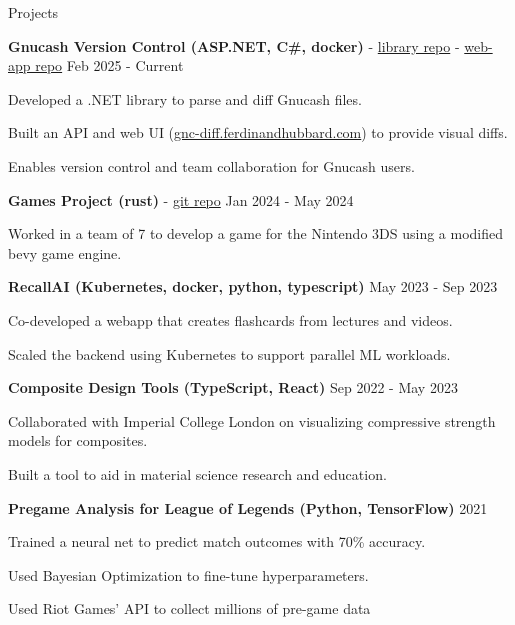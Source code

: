 \documentclass{resume} %
\let\olditemize\itemize
\let\endolditemize\enditemize
\renewenvironment{itemize}{
  \vspace*{-6pt}
  \olditemize
  \setlength{\itemsep}{0pt}    %
  \setlength{\topsep}{0pt}         %
  \setlength{\partopsep}{0pt}      %
  \setlength{\parsep}{0pt}         %
  \setlength{\parskip}{0pt}        %
  \setlength{\leftmargin}{1em}     %
}{\endolditemize}
\begin{document}
\begin{rSection}{Projects}

\textbf{Gnucash Version Control (ASP.NET, C\#, docker)} - \href{https://github.com/ferdinandhubbard981/gnucash-diff}{library repo} - \href{https://github.com/ferdinandhubbard981/gnucash-version-control-web}{web-app repo} \hfill Feb 2025 - Current
\begin{itemize}
    \item Developed a .NET library to parse and diff Gnucash files.
    \item Built an API and web UI (\href{https://gnc-diff.ferdinandhubbard.com}{gnc-diff.ferdinandhubbard.com}) to provide visual diffs.
    \item Enables version control and team collaboration for Gnucash users.
\end{itemize}

\textbf{Games Project (rust)} - \href{https://github.com/Team-Yarg/these\_times\_of\_mine}{git repo} \hfill Jan 2024 - May 2024
\begin{itemize}
    \item Worked in a team of 7 to develop a game for the Nintendo 3DS using a modified bevy game engine.
\end{itemize}

\textbf{RecallAI (Kubernetes, docker, python, typescript)} \hfill May 2023 - Sep 2023
\begin{itemize}
    \item Co-developed a webapp that creates flashcards from lectures and videos.
    \item Scaled the backend using Kubernetes to support parallel ML workloads.
\end{itemize}

\textbf{Composite Design Tools (TypeScript, React)} \hfill Sep 2022 - May 2023
\begin{itemize}
    \item Collaborated with Imperial College London on visualizing compressive strength models for composites.
    \item Built a tool to aid in material science research and education.
\end{itemize}

\textbf{Pregame Analysis for League of Legends (Python, TensorFlow)} \hfill 2021
\begin{itemize}
    \item Trained a neural net to predict match outcomes with 70\% accuracy.
    \item Used Bayesian Optimization to fine-tune hyperparameters.
    \item Used Riot Games' API to collect millions of pre-game data
\end{itemize}

\end{rSection}
\end{document}
